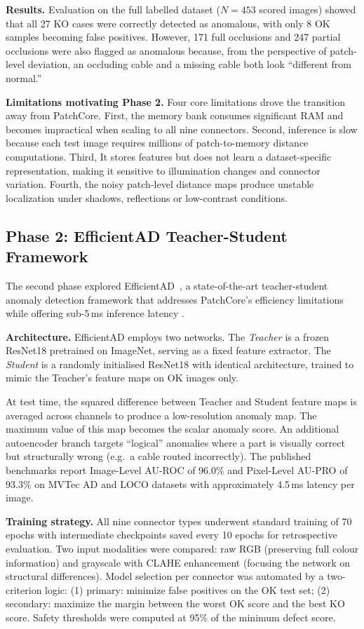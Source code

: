 \documentclass[11pt,a4paper]{article}
\begin{document}
\textbf{Results.} Evaluation on the full labelled dataset ($N = 453$ scored images) showed that all 27 KO cases were correctly detected as anomalous, with only 8 OK samples becoming false positives. However, 171 full occlusions and 247 partial occlusions were also flagged as anomalous because, from the perspective of patch-level deviation, an occluding cable and a missing cable both look ``different from normal.''

\textbf{Limitations motivating Phase 2.} Four core limitations drove the transition away from PatchCore. First, the memory bank consumes significant RAM and becomes impractical when scaling to all nine connectors. Second, inference is slow because each test image requires millions of patch-to-memory distance computations. Third, It stores features but does not learn a dataset-specific representation, making it sensitive to illumination changes and connector variation. Fourth, the noisy patch-level distance maps produce unstable localization under shadows, reflections or low-contrast conditions.

\subsection{Phase 2: EfficientAD Teacher-Student Framework}

The second phase explored EfficientAD~\cite{batzner2023efficientad}, a state-of-the-art teacher-student anomaly detection framework that addresses PatchCore's efficiency limitations while offering sub-5\,ms inference latency \cite{batzner2023efficientad}.

\textbf{Architecture.} EfficientAD employs two networks. The \emph{Teacher} is a frozen ResNet18 pretrained on ImageNet, serving as a fixed feature extractor. The \emph{Student} is a randomly initialised ResNet18 with identical architecture, trained to mimic the Teacher's feature maps on OK images only. 

At test time, the squared difference between Teacher and Student feature maps is averaged across channels to produce a low-resolution anomaly map. The maximum value of this map becomes the scalar anomaly score. An additional autoencoder branch targets ``logical'' anomalies where a part is visually correct but structurally wrong (e.g.\ a cable routed incorrectly). The published benchmarks report Image-Level AU-ROC of 96.0\% and Pixel-Level AU-PRO of 93.3\% on MVTec AD and LOCO datasets with approximately 4.5\,ms latency per image.

\textbf{Training strategy.} All nine connector types underwent standard training of 70 epochs with intermediate checkpoints saved every 10 epochs for retrospective evaluation. Two input modalities were compared: raw RGB (preserving full colour information) and grayscale with CLAHE enhancement (focusing the network on structural differences). Model selection per connector was automated by a two-criterion logic: (1) primary: minimize false positives on the OK test set; (2) secondary: maximize the margin between the worst OK score and the best KO score. Safety thresholds were computed at 95\% of the minimum defect score.
\end{document}
